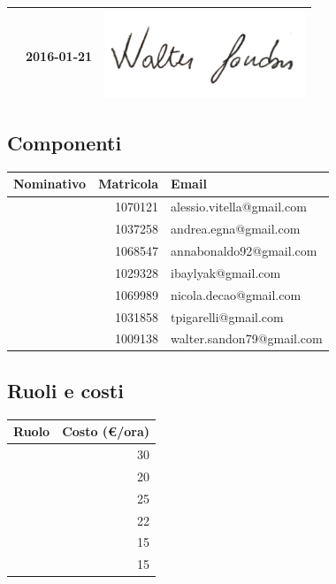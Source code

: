 \documentclass[12pt,a4paper]{article}
\begin{document}
\begin{table}[H]
\begin{center}
\begin{tabular}{l l l}
			\WS{} & 2016-01-21 & \includegraphics[width=6cm]{../img/firmaSandon.png} \\
			\bottomrule
		\end{tabular}
	\end{center}
\end{table}

\subsection{Componenti}

\begin{table}[H]
	\begin{center}
		\begin{tabular}{l r l}
			\toprule
            \textbf{Nominativo}	& \textbf{Matricola} & \textbf{Email} \\ \midrule
			\midrule
			\AVI{} & 1070121 & alessio.vitella@gmail.com \\ \midrule
			\AVE{} & 1037258 & andrea.egna@gmail.com \\ \midrule
			\AB{} & 1068547 & annabonaldo92@gmail.com \\ \midrule
			\IB{} & 1029328 & ibaylyak@gmail.com \\ \midrule
			\NDC{} & 1069989 & nicola.decao@gmail.com \\ \midrule
			\TP{}  & 1031858 & tpigarelli@gmail.com \\ \midrule
			\WS{} & 1009138 & walter.sandon79@gmail.com \\
			\bottomrule
		\end{tabular}
	\end{center}
\end{table}

\subsection{Ruoli e costi}\label{ruoli e costi}

\begin{table}[H]
	\begin{center}
		\begin{tabular}{l r}
			\toprule
            \textbf{Ruolo}	& \textbf{Costo (\euro/ora)} \\ \midrule
			\midrule
            \RE{} & 30 \\ \midrule
            \AM{} & 20 \\ \midrule
            \AN{} & 25 \\ \midrule
            \PG{} & 22 \\ \midrule
            \PR{} & 15 \\ \midrule
            \VR{} & 15 \\
			\bottomrule
		\end{tabular}
	\end{center}
\end{table}
\end{document}
